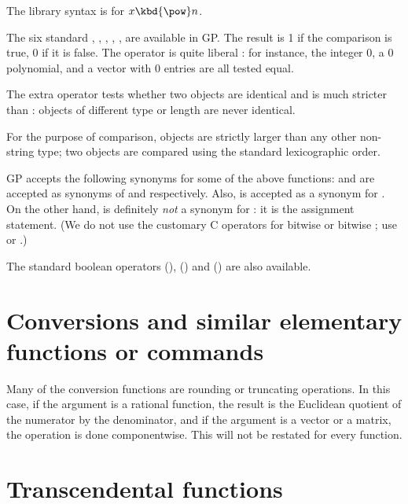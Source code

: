 The library syntax is 
for $x\hbox{\kbd{\pow}}n$.


 The six
standard  \kbd{<=}, \kbd{<}, \kbd{>=}, \kbd{>},
\kbd{==}, \kbd{!=} are available in GP. The result is 1 if the comparison is
true, 0 if it is false. The operator \kbd{==} is quite liberal : for
instance, the integer 0, a 0 polynomial, and a vector with 0 entries are all
tested equal.

The extra operator \kbd{===} tests whether two objects are identical and is
much stricter than \kbd{==} : objects of different type or length are never
identical.


For the purpose of comparison,  objects are strictly larger than any
other non-string type; two  objects are compared using the standard
lexicographic order.

GP accepts the following synonyms for some of the above functions:
\kbd{|} and \kbd{\&} are accepted as
synonyms of \kbd{||} and \kbd{\&\&} respectively. Also, \kbd{<>} is accepted
as a synonym for \kbd{!=}. On the other hand, \kbd{=} is definitely
\emph{not} a synonym for \kbd{==}: it is the assignment statement. (We do not
use the customary C operators for bitwise  or bitwise ; use
 or .)

The standard boolean operators \kbd{||} (), \kbd{\&\&}
() and \kbd{!} () are also available.

\section{Conversions and similar elementary functions or commands}
\label{se:conversion}

\noindent
Many of the conversion functions are rounding or truncating operations. In
this case, if the argument is a rational function, the result is the
Euclidean quotient of the numerator by the denominator, and if the argument
is a vector or a matrix, the operation is done componentwise. This will not
be restated for every function.


\section{Transcendental functions}\label{se:trans}

